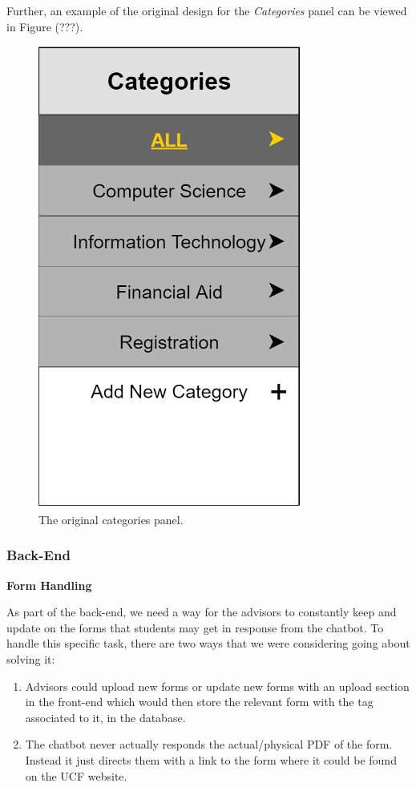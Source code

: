 \documentclass[titlepage, 12pt]{article}
\begin{document}
Further, an example of the original design for the \emph{Categories} panel can be viewed in Figure (???).

\begin{figure}[h]
    \centering\includegraphics[width=0.5\linewidth]{images/original-categories-panel.png}
    \caption{The original categories panel.}
\end{figure}

\subsubsection{Back-End}

\textbf{Form Handling}

As part of the back-end, we need a way for the advisors to constantly keep and update on the forms that students may get in response from the chatbot. To handle this specific task,  there are two ways that we were considering going about solving it:

\begin{enumerate}
    \item Advisors could upload new forms or update new forms with an upload section in the front-end which would then store the relevant form with the tag associated to it, in the database.
    \item The chatbot never actually responds the actual/physical PDF of the form. Instead it just directs them with a link to the form where it could be found on the UCF website.
\end{enumerate}
\end{document}
